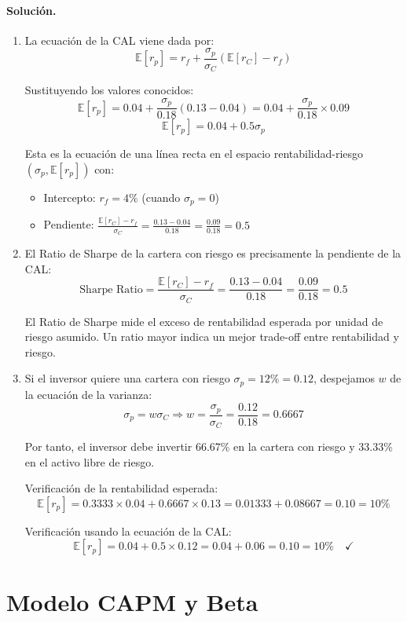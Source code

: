 \documentclass[12pt,a4paper]{article}
\newcommand{\E}{\mathbb{E}}
\newenvironment{solucion}{\paragraph{Solución.}}{}
\begin{document}
\begin{solucion}
\begin{enumerate}[label=\alph*)]
  \item La ecuación de la CAL viene dada por:
  \[
  \E[r_p] = r_f + \frac{\sigma_p}{\sigma_C} (\E[r_C] - r_f)
  \]
  
  Sustituyendo los valores conocidos:
  \[
  \E[r_p] = 0.04 + \frac{\sigma_p}{0.18} (0.13 - 0.04) = 0.04 + \frac{\sigma_p}{0.18} \times 0.09
  \]
  \[
  \E[r_p] = 0.04 + 0.5 \sigma_p
  \]
  
  Esta es la ecuación de una línea recta en el espacio rentabilidad-riesgo $(\sigma_p, \E[r_p])$ con:
  \begin{itemize}
    \item Intercepto: $r_f = 4\%$ (cuando $\sigma_p = 0$)
    \item Pendiente: $\frac{\E[r_C] - r_f}{\sigma_C} = \frac{0.13 - 0.04}{0.18} = \frac{0.09}{0.18} = 0.5$
  \end{itemize}

  \item El Ratio de Sharpe de la cartera con riesgo es precisamente la pendiente de la CAL:
  \[
  \text{Sharpe Ratio} = \frac{\E[r_C] - r_f}{\sigma_C} = \frac{0.13 - 0.04}{0.18} = \frac{0.09}{0.18} = 0.5
  \]
  
  El Ratio de Sharpe mide el exceso de rentabilidad esperada por unidad de riesgo asumido. Un ratio mayor indica un mejor trade-off entre rentabilidad y riesgo.

  \item Si el inversor quiere una cartera con riesgo $\sigma_p = 12\% = 0.12$, despejamos $w$ de la ecuación de la varianza:
  \[
  \sigma_p = w \sigma_C \Rightarrow w = \frac{\sigma_p}{\sigma_C} = \frac{0.12}{0.18} = 0.6667
  \]
  
  Por tanto, el inversor debe invertir 66.67\% en la cartera con riesgo y 33.33\% en el activo libre de riesgo.

  Verificación de la rentabilidad esperada:
  \[
  \E[r_p] = 0.3333 \times 0.04 + 0.6667 \times 0.13 = 0.01333 + 0.08667 = 0.10 = 10\%
  \]
  
  Verificación usando la ecuación de la CAL:
  \[
  \E[r_p] = 0.04 + 0.5 \times 0.12 = 0.04 + 0.06 = 0.10 = 10\% \quad \checkmark
  \]
\end{enumerate}
\end{solucion}

\section{Modelo CAPM y Beta}
\end{document}
